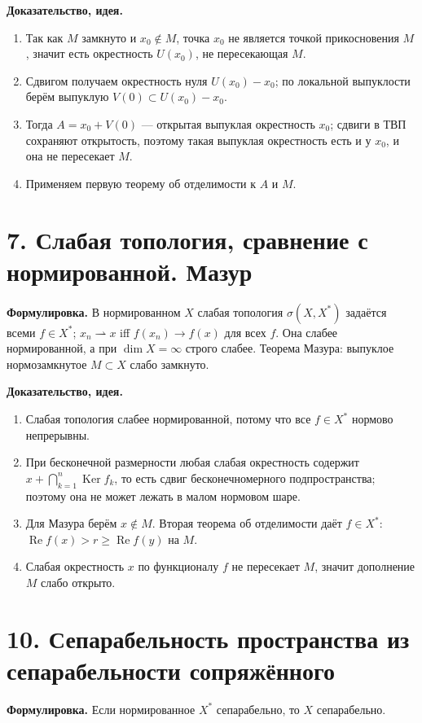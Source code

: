 \documentclass[10pt,a4paper]{article}
\newcommand{\X}{X}
\newcommand{\Ker}{\operatorname{Ker}}
\newcommand{\Ree}{\operatorname{Re}}
\begin{document}
	\textbf{Доказательство, идея.}
	\begin{enumerate}
		\item Так как $M$ замкнуто и $x_0\notin M$, точка $x_0$ не является точкой прикосновения $M$, значит есть окрестность $U(x_0)$, не пересекающая $M$.
		\item Сдвигом получаем окрестность нуля $U(x_0)-x_0$; по локальной выпуклости берём выпуклую $V(0)\subset U(x_0)-x_0$.
		\item Тогда $A=x_0+V(0)$ --- открытая выпуклая окрестность $x_0$; сдвиги в ТВП сохраняют открытость, поэтому такая выпуклая окрестность есть и у $x_0$, и она не пересекает $M$.
		\item Применяем первую теорему об отделимости к $A$ и $M$.
	\end{enumerate}

	\section*{7. Слабая топология, сравнение с нормированной. Мазур}
	\textbf{Формулировка.} В нормированном $\X$ слабая топология $\sigma(\X,\X^\ast)$ задаётся всеми $f\in\X^\ast$; $x_n\rightharpoonup x$ iff $f(x_n)\to f(x)$ для всех $f$. Она слабее нормированной, а при $\dim\X=\infty$ строго слабее. Теорема Мазура: выпуклое нормозамкнутое $M\subset\X$ слабо замкнуто.

	\textbf{Доказательство, идея.}
	\begin{enumerate}
		\item Слабая топология слабее нормированной, потому что все $f\in\X^\ast$ нормово непрерывны.
		\item При бесконечной размерности любая слабая окрестность содержит $x+\bigcap_{k=1}^n\Ker f_k$, то есть сдвиг бесконечномерного подпространства; поэтому она не может лежать в малом нормовом шаре.
		\item Для Мазура берём $x\notin M$. Вторая теорема об отделимости даёт $f\in\X^\ast$: $\Ree f(x)>r\ge\Ree f(y)$ на $M$.
		\item Слабая окрестность $x$ по функционалу $f$ не пересекает $M$, значит дополнение $M$ слабо открыто.
	\end{enumerate}

	\section*{10. Сепарабельность пространства из сепарабельности сопряжённого}
	\textbf{Формулировка.} Если нормированное $\X^\ast$ сепарабельно, то $\X$ сепарабельно.
\end{document}
